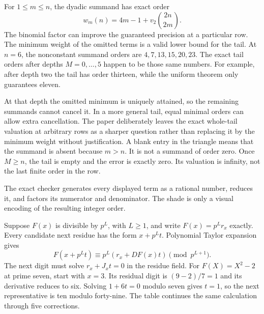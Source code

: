 For $1\le m\le n$, the dyadic summand has exact order
\[
 w_m(n)=4m-1+v_2\binom{2n}{2m}.
\]
The binomial factor can improve the guaranteed precision at a particular row. The minimum weight of the omitted terms is a valid lower bound for the tail.
At $n=6$, the nonconstant summand orders are $4,7,13,15,20,23$. The exact tail orders after depths $M=0,\ldots,5$ happen to be those same numbers. For example, after depth two the tail has order thirteen, while the uniform theorem only guarantees eleven.

At that depth the omitted minimum is uniquely attained, so the remaining summands cannot cancel it. In a more general tail, equal minimal orders can allow extra cancellation. The paper deliberately leaves the exact whole-tail valuation at arbitrary rows as a sharper question rather than replacing it by the minimum weight without justification.
A blank entry in the triangle means that the summand is absent because $m>n$. It is not a summand of order zero. Once $M\ge n$, the tail is empty and the error is exactly zero. Its valuation is infinity, not the last finite order in the row.

The exact checker generates every displayed term as a rational number, reduces it, and factors its numerator and denominator. The shade is only a visual encoding of the resulting integer order.

Suppose $F(x)$ is divisible by $p^L$, with $L\ge1$, and write $F(x)=p^Lr_x$ exactly. Every candidate next residue has the form $x+p^Lt$. Polynomial Taylor expansion gives
\[
 F(x+p^Lt)\equiv p^L(r_x+DF(x)t)\pmod{p^{L+1}}.
\]
The next digit must solve $r_x+J_xt=0$ in the residue field.
For $F(X)=X^2-2$ at prime seven, start with $x=3$. Its residual digit is $(9-2)/7=1$ and its derivative reduces to six. Solving $1+6t=0$ modulo seven gives $t=1$, so the next representative is ten modulo forty-nine. The table continues the same calculation through five corrections.

